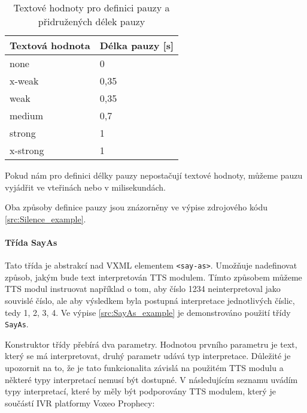 \documentclass[ing,male,java,dept460,twoside]{diploma}						%
\begin{document}
\begin{table}
	\centering
	\begin{tabular}{|l|l|}
		\hline
		Textová hodnota & Délka pauzy [s] \\
		\hline
		none & 0 \\
		\hline
		x-weak & 0,35 \\
		\hline
		weak & 0,35 \\
		\hline
		medium & 0,7 \\
		\hline
		strong & 1 \\
		\hline
		x-strong & 1 \\
		\hline
	\end{tabular}
	\caption{Textové hodnoty pro definici pauzy a přidružených délek pauzy}
	\label{tab:Silence_pauses}
\end{table}

Pokud nám pro definici délky pauzy nepostačují textové hodnoty, můžeme pauzu vyjádřit ve vteřinách nebo v milisekundách.

Oba způsoby definice pauzy jsou znázorněny ve výpise zdrojového kódu \ref{src:Silence_example}.



\paragraph{Třída SayAs}
\label{sec:SayAs}
Tato třída je abstrakcí nad VXML elementem \texttt{<say-as>}. Umožňuje nadefinovat způsob, jakým bude text interpretován TTS modulem. Tímto způsobem můžeme TTS modul instruovat například o tom, aby číslo 1234 neinterpretoval jako souvislé číslo, ale aby výsledkem byla postupná interpretace jednotlivých číslic, tedy 1, 2, 3, 4. Ve výpise \ref{src:SayAs_example} je demonstrováno použití třídy \texttt{SayAs}.



Konstruktor třídy přebírá dva parametry. Hodnotou prvního parametru je text, který se má interpretovat, druhý parametr udává typ interpretace. Důležité je upozornit na to, že je tato funkcionalita závislá na použitém TTS modulu a některé typy interpretací nemusí být dostupné. V následujícím seznamu uvádím typy interpretací, které by měly být podporovány TTS modulem, který je součástí IVR platformy Voxeo Prophecy\cite{vxml_org}:
\end{document}
